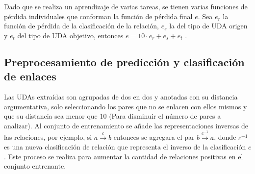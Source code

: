 \documentclass[a4paper,11pt,twocolumn,twoside]{article}
\begin{document}
Dado que se realiza un aprendizaje de varias tareas, se tienen varias funciones de pérdida individuales que conforman 
la función de pérdida final $e$. Sea $e_r$ la función de pérdida de la clasificación de la relación, $e_s$ la del tipo de UDA origen  
y $e_t$ del tipo de UDA objetivo, entonces $e = 10 \cdot e_r + e_s + e_t$ \cite{galassi2021deep}.

\subsection{Preprocesamiento de predicción y clasificación de enlaces}

Las UDAs extraídas son agrupadas de dos en dos y anotadas con su distancia argumentativa, solo seleccionando
los pares que no se enlacen con ellos mismos y que su distancia sea menor que $10$ (Para disminuir el número 
de pares a analizar). Al conjunto de entrenamiento se añade las representaciones inversas de las relaciones, por ejemplo, si $a \xrightarrow{c} b$ entonces 
se agregara el par $b \xrightarrow{c^{-1}} a$, donde $c^{-1}$ es una nueva clasificación de relación que representa
el inverso de la clasificación $c$. Este proceso se realiza para aumentar la cantidad de relaciones positivas en el
conjunto entrenante.


\end{document}
